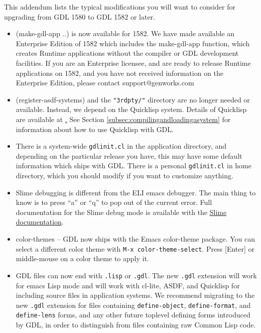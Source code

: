 \documentclass [11pt]{book}
\begin{document}
This addendum lists the typical modifications you will want to
consider for upgrading from GDL 1580 to GDL 1582 or later.

\begin{itemize}

\item (make-gdl-app ..) is now available for 1582. We have
made available an Enterprise Edition of 1582 which includes the
make-gdl-app function, which creates Runtime applications without the
compiler or GDL development facilities.  If you are an Enterprise
licensee, and are ready to release Runtime applications on 1582, and
you have not received information on the Enterprise Edition, please
contact support@genworks.com

\item (register-asdf-systems) and the \texttt{"3rdpty/"} directory are no longer needed or available. Instead, we depend on the Quicklisp
system. Details of Quicklisp are available at \href{http://www.quicklisp.org}. See Section 
\ref{subsec:compilingandloadingasystem} for information about how to use Quicklisp with GDL.

\item There is a system-wide \texttt{gdlinit.cl} in the application directory, and depending on the
       particular release you have, this may have some default
       information which ships with GDL. There is a personal \texttt{gdlinit.cl} in home directory, which you should modify if you want to
       customize anything.

\item Slime debugging is different from the ELI emacs debugger. The main thing to know is 
to press ``a'' or ``q'' to pop out of the current error. Full documentation for the Slime debug mode
is available with the \href{http://common-lisp.net/project/slime/doc/html/Debugger.html}{Slime documentation}.

\item color-themes -- GDL now ships with the Emacs
       color-theme package. You can select a different color theme with \texttt{M-x color-theme-select}. Press [Enter] or middle-mouse on a color theme to apply it.

\item GDL files can now end with \texttt{.lisp} or \texttt{.gdl}. The new \texttt{.gdl} extension will work for emacs Lisp mode and will work with
	 cl-lite, ASDF, and Quicklisp for including source files in application systems. We recommend migrating
to the new \texttt{.gdl} extension for files containing \texttt{define-object}, \texttt{define-format}, and \texttt{define-lens} forms, and any other future toplevel defining forms introduced by GDL, in order to distinguish 
from files containing raw Common Lisp code.


\end{itemize}
\end{document}
